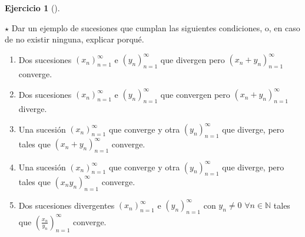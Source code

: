 \documentclass[
  a4paper,
]{scrreport}
\providecommand{\tightlist}{%
  \setlength{\itemsep}{0pt}\setlength{\parskip}{0pt}}\usepackage{longtable,booktabs,array}
\theoremstyle{definition}
\newtheorem{exercise}{Ejercicio}[chapter]
\theoremstyle{remark}
\begin{document}
\begin{exercise}[]\protect\hypertarget{exr-ejemplo-sucesiones-2}{}\label{exr-ejemplo-sucesiones-2}

\(\star\) Dar un ejemplo de sucesiones que cumplan las siguientes
condiciones, o, en caso de no existir ninguna, explicar porqué.

\begin{enumerate}
\def\labelenumi{\alph{enumi}.}
\tightlist
\item
  Dos sucesiones \((x_n)_{n=1}^\infty\) e \((y_n)_{n=1}^\infty\) que
  divergen pero \((x_n+y_n)_{n=1}^\infty\) converge.
\item
  Dos sucesiones \((x_n)_{n=1}^\infty\) e \((y_n)_{n=1}^\infty\) que
  convergen pero \((x_n+y_n)_{n=1}^\infty\) diverge.
\item
  Una sucesión \((x_n)_{n=1}^\infty\) que converge y otra
  \((y_n)_{n=1}^\infty\) que diverge, pero tales que
  \((x_n+y_n)_{n=1}^\infty\) converge.
\item
  Una sucesión \((x_n)_{n=1}^\infty\) que converge y otra
  \((y_n)_{n=1}^\infty\) que diverge, pero tales que
  \((x_ny_n)_{n=1}^\infty\) converge.
\item
  Dos sucesiones divergentes \((x_n)_{n=1}^\infty\) e
  \((y_n)_{n=1}^\infty\) con \(y_n\neq 0\) \(\forall n\in\mathbb{N}\)
  tales que \(\left(\frac{x_n}{y_n}\right)_{n=1}^\infty\) converge.
\end{enumerate}

\end{exercise}
\end{document}
